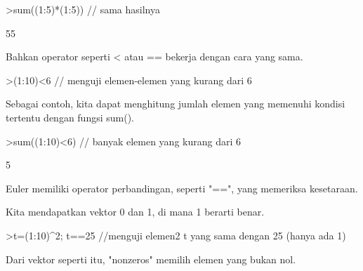 \documentclass[a4paper,10pt]{article}
\begin{document}
\begin{eulernotebook}
\begin{eulercomment}
\begin{eulercomment}
\begin{eulercomment}
\begin{eulercomment}
\begin{eulerprompt}
>sum((1:5)*(1:5)) // sama hasilnya
\end{eulerprompt}
\begin{euleroutput}
  55
\end{euleroutput}
\begin{eulercomment}
Bahkan operator seperti \textless{} atau == bekerja dengan cara yang sama.
\end{eulercomment}
\begin{eulerprompt}
>(1:10)<6 // menguji elemen-elemen yang kurang dari 6
\end{eulerprompt}
\begin{euleroutput}
  [1,  1,  1,  1,  1,  0,  0,  0,  0,  0]
\end{euleroutput}
\begin{eulercomment}
Sebagai contoh, kita dapat menghitung jumlah elemen yang memenuhi
kondisi tertentu dengan fungsi sum().
\end{eulercomment}
\begin{eulerprompt}
>sum((1:10)<6) // banyak elemen yang kurang dari 6
\end{eulerprompt}
\begin{euleroutput}
  5
\end{euleroutput}
\begin{eulercomment}
Euler memiliki operator perbandingan, seperti "==", yang memeriksa
kesetaraan.

Kita mendapatkan vektor 0 dan 1, di mana 1 berarti benar.
\end{eulercomment}
\begin{eulerprompt}
>t=(1:10)^2; t==25 //menguji elemen2 t yang sama dengan 25 (hanya ada 1)
\end{eulerprompt}
\begin{euleroutput}
  [0,  0,  0,  0,  1,  0,  0,  0,  0,  0]
\end{euleroutput}
\begin{eulercomment}
Dari vektor seperti itu, "nonzeros" memilih elemen yang bukan nol.


\end{eulercomment}
\end{eulercomment}
\end{eulercomment}
\end{eulercomment}
\end{eulercomment}
\end{eulernotebook}
\end{document}
